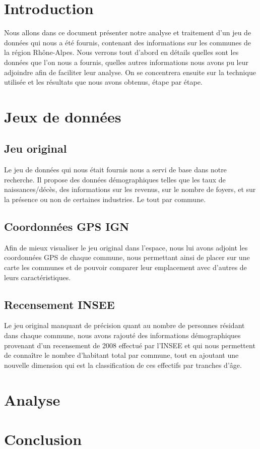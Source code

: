 \section{Introduction}

Nous allons dans ce document présenter notre analyse et traitement d'un jeu de données qui nous a été fournis, contenant des informations sur les communes de la région Rhône-Alpes. Nous verrons tout d'abord en détails quelles sont les données que l'on nous a fournis, quelles autres informations nous avons pu leur adjoindre afin de faciliter leur analyse. On se concentrera ensuite sur la technique utilisée et les résultats que nous avons obtenus, étape par étape.

\section{Jeux de données}

\subsection{Jeu original}

Le jeu de données qui nous était fournis nous a servi de base dans notre recherche. Il propose des données démographiques telles que les taux de naissances/décès, des informations sur les revenus, sur le nombre de foyers, et sur la présence ou non de certaines industries. Le tout par commune.

\subsection{Coordonnées GPS IGN}

Afin de mieux visualiser le jeu original dans l'espace, nous lui avons adjoint les coordonnées GPS de chaque commune, nous permettant ainsi de placer sur une carte les communes et de pouvoir comparer leur emplacement avec d'autres de leurs caractéristiques.

\subsection{Recensement INSEE}

Le jeu original manquant de précision quant au nombre de personnes résidant dans chaque commune, nous avons rajouté des informations démographiques provenant d'un recensement de 2008 effectué par l'INSEE et qui nous permettent de connaître le nombre d'habitant total par commune, tout en ajoutant une nouvelle dimension qui est la classification de ces effectifs par tranches d'âge.

\section{Analyse}

\section{Conclusion}